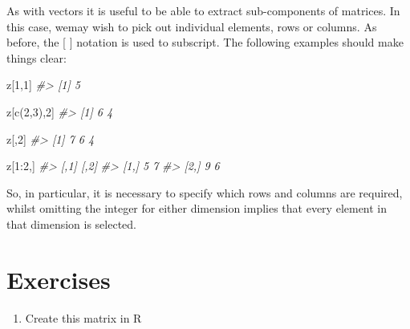 \documentclass[
]{book}
\newenvironment{Shaded}{\begin{snugshade}}{\end{snugshade}}
\newcommand{\CommentTok}[1]{\textcolor[rgb]{0.56,0.35,0.01}{\textit{#1}}}
\newcommand{\DecValTok}[1]{\textcolor[rgb]{0.00,0.00,0.81}{#1}}
\newcommand{\FunctionTok}[1]{\textcolor[rgb]{0.00,0.00,0.00}{#1}}
\newcommand{\NormalTok}[1]{#1}
\newcommand{\SpecialCharTok}[1]{\textcolor[rgb]{0.00,0.00,0.00}{#1}}
\providecommand{\tightlist}{%
  \setlength{\itemsep}{0pt}\setlength{\parskip}{0pt}}
\begin{document}
As with vectors it is useful to be able to extract sub-components of matrices. In this case, wemay wish to pick out individual elements, rows or columns. As before, the {[} {]} notation is used to subscript. The following examples should make things clear:

\begin{Shaded}
\begin{Highlighting}[]
\NormalTok{z[}\DecValTok{1}\NormalTok{,}\DecValTok{1}\NormalTok{]}
\CommentTok{\#\textgreater{} [1] 5}
\end{Highlighting}
\end{Shaded}

\begin{Shaded}
\begin{Highlighting}[]
\NormalTok{z[}\FunctionTok{c}\NormalTok{(}\DecValTok{2}\NormalTok{,}\DecValTok{3}\NormalTok{),}\DecValTok{2}\NormalTok{]}
\CommentTok{\#\textgreater{} [1] 6 4}
\end{Highlighting}
\end{Shaded}

\begin{Shaded}
\begin{Highlighting}[]
\NormalTok{z[,}\DecValTok{2}\NormalTok{]}
\CommentTok{\#\textgreater{} [1] 7 6 4}
\end{Highlighting}
\end{Shaded}

\begin{quote}
\end{quote}

\begin{Shaded}
\begin{Highlighting}[]
\NormalTok{z[}\DecValTok{1}\SpecialCharTok{:}\DecValTok{2}\NormalTok{,]}
\CommentTok{\#\textgreater{}      [,1] [,2]}
\CommentTok{\#\textgreater{} [1,]    5    7}
\CommentTok{\#\textgreater{} [2,]    9    6}
\end{Highlighting}
\end{Shaded}

So, in particular, it is necessary to specify which rows and columns are required, whilst omitting
the integer for either dimension implies that every element in that dimension is selected.

\hypertarget{exercises-2}{%
\section{Exercises}\label{exercises-2}}

\begin{enumerate}
\def\labelenumi{\arabic{enumi}.}
\tightlist
\item
  Create this matrix in R
\end{enumerate}
\end{document}
